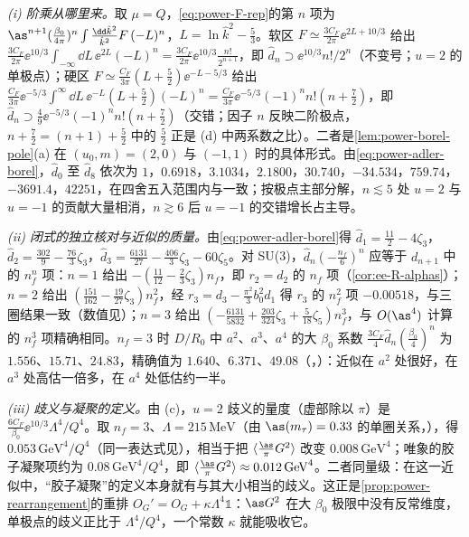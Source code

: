 \begin{example}[带 $n$ 个费米子泡的单胶子]\label{ex:power-renormalon-chain}
\emph{(i) 阶乘从哪里来。}取 $\mu=Q$，\eqref{eq:power-F-rep}的第 $n$ 项为 $\as^{n+1}(\frac{\beta_0}{4\pi})^n\int\frac{\dd\hat k^2}{\hat k^2}F\,(-L)^n$，$L=\ln\hat k^2-\frac53$。软区 $F\simeq\frac{3C_F}{2\pi}\ee^{2L+10/3}$ 给出 $\frac{3C_F}{2\pi}\ee^{10/3}\int_{-\infty}\dd L\,\ee^{2L}(-L)^n=\frac{3C_F}{2\pi}\ee^{10/3}\frac{n!}{2^{n+1}}$，即 $\hat d_n\supset\ee^{10/3}n!/2^n$（不变号；$u=2$ 的单极点）；硬区 $F\simeq\frac{C_F}{3\pi}(L+\frac52)\ee^{-L-5/3}$ 给出 $\frac{C_F}{3\pi}\ee^{-5/3}\int^\infty\dd L\,\ee^{-L}(L+\frac52)(-L)^n=\frac{C_F}{3\pi}\ee^{-5/3}(-1)^nn!(n+\frac72)$，即 $\hat d_n\supset\frac49\ee^{-5/3}(-1)^nn!(n+\frac72)$（交错；因子 $n$ 反映二阶极点，$n+\frac72=(n+1)+\frac52$ 中的 $\frac52$ 正是 (d) 中两系数之比）。二者是\cref{lem:power-borel-pole}(a) 在 $(u_0,m)=(2,0)$ 与 $(-1,1)$ 时的具体形式。由\eqref{eq:power-adler-borel}，$\hat d_0$ 至 $\hat d_8$ 依次为 $1$，$0.6918$，$3.1034$，$2.1800$，$30.740$，$-34.534$，$759.74$，$-3691.4$，$42251$，在四舍五入范围内与\cite[表~4]{Beneke1999}一致；按极点主部分解\cite[表~5]{Beneke1999}，$n\lesssim5$ 处 $u=2$ 与 $u=-1$ 的贡献大量相消，$n\gtrsim6$ 后 $u=-1$ 的交错增长占主导。

\emph{(ii) 闭式的独立核对与近似的质量。}由\eqref{eq:power-adler-borel}得 $\hat d_1=\frac{11}{2}-4\zeta_3$，$\hat d_2=\frac{302}{9}-\frac{76}{3}\zeta_3$，$\hat d_3=\frac{6131}{27}-\frac{406}{3}\zeta_3-60\zeta_5$。对 SU(3)，$\hat d_n(-\frac{n_f}6)^n$ 应等于 $d_{n+1}$ 中的 $n_f^n$ 项：$n=1$ 给出 $-(\frac{11}{12}-\frac23\zeta_3)n_f$，即 $r_2=d_2$ 的 $n_f$ 项（\cref{cor:ee-R-alphas}）；$n=2$ 给出 $(\frac{151}{162}-\frac{19}{27}\zeta_3)n_f^2$，经 $r_3=d_3-\frac{\pi^2}{3}b_0^2d_1$ 得 $r_3$ 的 $n_f^2$ 项 $-0.00518$，与三圈结果\cite{GorishniiKataevLarin1991,SurguladzeSamuel1991}一致（数值见\cite[式~(5)]{BaikovChetyrkinKuhn2008}）；$n=3$ 给出 $(-\frac{6131}{5832}+\frac{203}{324}\zeta_3+\frac5{18}\zeta_5)n_f^3$，与 $O(\as^4)$ 计算的 $n_f^3$ 项\cite[式~(4)]{BaikovChetyrkinKuhn2008}精确相同。$n_f=3$ 时 $D/R_0$ 中 $a^2$、$a^3$、$a^4$ 的大 $\beta_0$ 系数 $\frac{3C_F}{4}\hat d_n(\frac{\beta_0}{4})^n$ 为 $1.556$、$15.71$、$24.83$，精确值为 $1.640$、$6.371$、$49.08$（\cite[表~4]{Beneke1999}，\cite[式~(8)]{BaikovChetyrkinKuhn2008}）：近似在 $a^2$ 处很好，在 $a^3$ 处高估一倍多，在 $a^4$ 处低估约一半。

\emph{(iii) 歧义与凝聚的定义。}由 (c)，$u=2$ 歧义的量度（虚部除以 $\pi$）是 $\frac{6C_F}{\beta_0}\ee^{10/3}\Lambda^4/Q^4$。取 $n_f=3$、$\Lambda=215\,\mathrm{MeV}$（由 $\as(m_\tau)=0.33$ 的单圈关系，\cite[脚注~42]{Beneke1999}），得 $0.053\,\mathrm{GeV}^4/Q^4$（同一表达式见\cite[式~(5.12)]{Beneke1999}），相当于把 $\langle\frac{\as}{\pi}G^2\rangle$ 改变 $0.008\,\mathrm{GeV}^4$；唯象的胶子凝聚项约为 $0.08\,\mathrm{GeV}^4/Q^4$\cite[式~(5.13)]{Beneke1999}，即 $\langle\frac{\as}{\pi}G^2\rangle\approx0.012\,\mathrm{GeV}^4$。二者同量级：在这一近似中，“胶子凝聚”的定义本身就有与其大小相当的歧义。这正是\cref{prop:power-rearrangement}的重排 $O_G'=O_G+\kappa\Lambda^4\mathbb 1$：$\as G^2$ 在大 $\beta_0$ 极限中没有反常维度，单极点的歧义正比于 $\Lambda^4/Q^4$，一个常数 $\kappa$ 就能吸收它。


\end{example}

